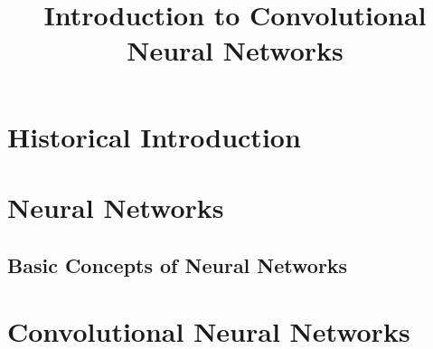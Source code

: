 \documentclass[a4paper]{article}
\begin{document}
\title{Introduction to Convolutional Neural Networks}
\maketitle

\section{Historical Introduction}

\section{Neural Networks}

\subsection{Basic Concepts of Neural Networks}

\section{Convolutional Neural Networks}
\end{document}
